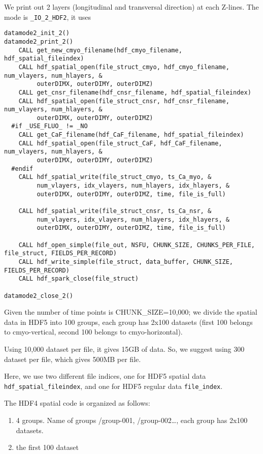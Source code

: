 We print out 2 layers (longitudinal and transversal direction) at each Z-lines.
The mode is \verb!_IO_2_HDF2!, it uses
\begin{verbatim}
datamode2_init_2()
datamode2_print_2()
    CALL get_new_cmyo_filename(hdf_cmyo_filename, hdf_spatial_fileindex)
    CALL hdf_spatial_open(file_struct_cmyo, hdf_cmyo_filename, num_vlayers, num_hlayers, &
         outerDIMX, outerDIMY, outerDIMZ)
    CALL get_cnsr_filename(hdf_cnsr_filename, hdf_spatial_fileindex)
    CALL hdf_spatial_open(file_struct_cnsr, hdf_cnsr_filename, num_vlayers, num_hlayers, &
         outerDIMX, outerDIMY, outerDIMZ)
  #if _USE_FLUO_ != _NO
    CALL get_CaF_filename(hdf_CaF_filename, hdf_spatial_fileindex)
    CALL hdf_spatial_open(file_struct_CaF, hdf_CaF_filename, num_vlayers, num_hlayers, &
         outerDIMX, outerDIMY, outerDIMZ)
  #endif
    CALL hdf_spatial_write(file_struct_cmyo, ts_Ca_myo, &
         num_vlayers, idx_vlayers, num_hlayers, idx_hlayers, &
         outerDIMX, outerDIMY, outerDIMZ, time, file_is_full)

    CALL hdf_spatial_write(file_struct_cnsr, ts_Ca_nsr, &
         num_vlayers, idx_vlayers, num_hlayers, idx_hlayers, &
         outerDIMX, outerDIMY, outerDIMZ, time, file_is_full)

    CALL hdf_open_simple(file_out, NSFU, CHUNK_SIZE, CHUNKS_PER_FILE, file_struct, FIELDS_PER_RECORD)
    CALL hdf_write_simple(file_struct, data_buffer, CHUNK_SIZE, FIELDS_PER_RECORD)
    CALL hdf_spark_close(file_struct)
  
datamode2_close_2()
\end{verbatim}
Given the number of time points is CHUNK\_SIZE=10,000; we divide the
spatial data in HDF5 into 100 groups, each group has 2x100 datasets (first 100
belongs to cmyo-vertical, second 100 belongs to cmyo-horizontal).

\begin{framed}
Using 10,000 dataset per file, it gives 15GB of data. So, we suggest using
300 dataset per file, which gives 500MB per file.
\end{framed}
Here, we use two different file indices, one for HDF5 spatial data
\verb!hdf_spatial_fileindex!, and one for HDF5 regular data \verb!file_index!. 

The HDF4 spatial code is organized as follows:
\begin{enumerate}
  \item 4 groups. Name of groups /group-001, /group-002\ldots, each group has 2x100
  datasets.
  \item the first 100 dataset 
\end{enumerate}

